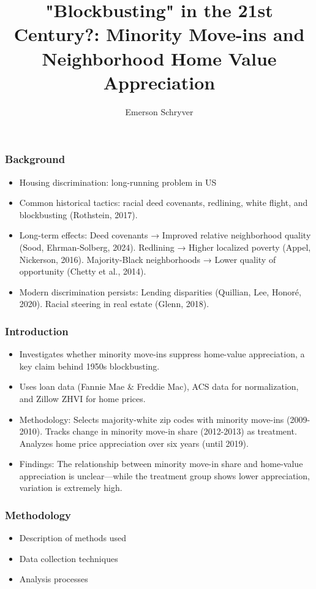 \documentclass{beamer}
\title[Minority Move-Ins and Home Appreciation]{"Blockbusting" in the 21st Century?: Minority Move-ins and Neighborhood Home Value Appreciation}
\author{Emerson Schryver}
\begin{document}
\begin{frame}
    \maketitle
\end{frame}
\begin{frame}
\frametitle{Background}
\begin{itemize}
    \item Housing discrimination: long-running problem in US
    \item Common historical tactics: racial deed covenants, redlining, white flight, and blockbusting (Rothstein, 2017).
    \item Long-term effects:
    Deed covenants → Improved relative neighborhood quality (Sood, Ehrman-Solberg, 2024).
Redlining → Higher localized poverty (Appel, Nickerson, 2016).
Majority-Black neighborhoods → Lower quality of opportunity (Chetty et al., 2014).

    \item Modern discrimination persists:
    Lending disparities (Quillian, Lee, Honoré, 2020).
    Racial steering in real estate (Glenn, 2018).
    
\end{itemize}
\end{frame}
\begin{frame}
\frametitle{Introduction}
\begin{itemize}
    \item Investigates whether minority move-ins suppress home-value appreciation, a key claim behind 1950s blockbusting.
    \item Uses loan data (Fannie Mae \& Freddie Mac), ACS data for normalization, and Zillow ZHVI for home prices.
    \item Methodology:
    Selects majority-white zip codes with minority move-ins (2009-2010).
    Tracks change in minority move-in share (2012-2013) as treatment.
    Analyzes home price appreciation over six years (until 2019).    
    \item Findings: The relationship between minority move-in share and home-value appreciation is unclear—while the treatment group shows lower appreciation, variation is extremely high.
\end{itemize}
\end{frame}
\begin{frame}
\frametitle{Methodology}
\begin{itemize}
    \item Description of methods used
    \item Data collection techniques
    \item Analysis processes
\end{itemize}
\end{frame}
\end{document}
